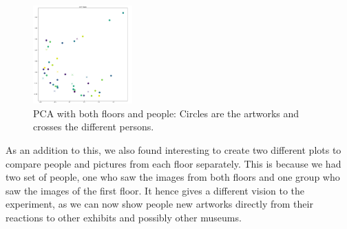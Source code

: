 \documentclass[journal, a4paper]{IEEEtran}
\begin{document}
\begin{figure}[h]
    \centering
    \includegraphics[width=3.8cm]{PCABoth.png}
    \caption{PCA with both floors and people: Circles are the artworks and crosses the different persons.}
    \label{fig:pca}
\end{figure}

As an addition to this, we also found interesting to create two different plots to compare people and pictures from each floor separately. This is because we had two set of people, one who saw the images from both floors and one group who saw the images of the first floor. It hence gives a different vision to the experiment, as we can now show people new artworks directly from their reactions to other exhibits and possibly other museums.
\end{document}
